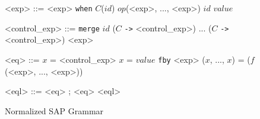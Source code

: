 \begin{figure}[!h]
\begin{grammar}
<exp> ::= <exp> \verb|when| $C$($id$)
\alt $op$(<exp>, ..., <exp>)
\alt $id$
\alt $value$

<control_exp> ::=
\verb|merge| $id$ ($C$ \verb|->| <control_exp>) ... ($C$ \verb|->| <control_exp>)
\alt <exp>

<eq> ::= $x$ = <control_exp>
\alt $x$ = $value$ \verb|fby| <exp>
\alt ($x$, ..., $x$) = ($f$(<exp>, ..., <exp>))

<eql> ::= <eq> ; <eq> \alt <eql>

\end{grammar}
\hrulefill
\caption{Normalized SAP Grammar}
\label{NsapGrammar}
\end{figure}
